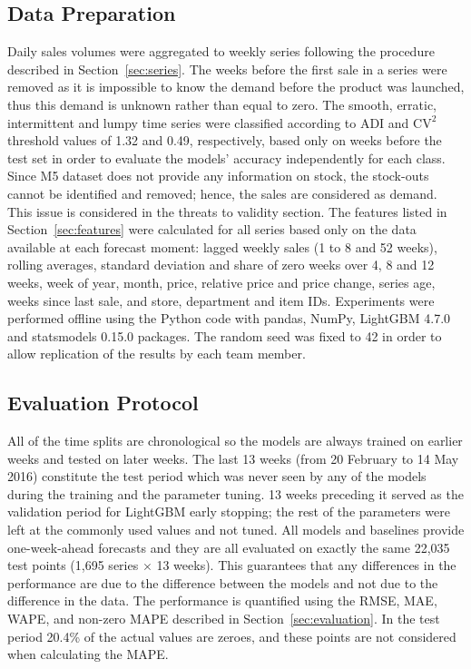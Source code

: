 \documentclass{StockSense}
\begin{document}
\subsection{Data Preparation}

Daily sales volumes were aggregated to weekly series following the procedure described in Section~\ref{sec:series}. The weeks before the first sale in a series were removed as it is impossible to know the demand before the product was launched, thus this demand is unknown rather than equal to zero. The smooth, erratic, intermittent and lumpy time series were classified according to ADI and $\mathrm{CV}^2$ threshold values of 1.32 and 0.49, respectively, based only on weeks before the test set in order to evaluate the models' accuracy independently for each class. Since M5 dataset does not provide any information on stock, the stock-outs cannot be identified and removed; hence, the sales are considered as demand. This issue is considered in the threats to validity section. The features listed in Section~\ref{sec:features} were calculated for all series based only on the data available at each forecast moment: lagged weekly sales (1 to 8 and 52 weeks), rolling averages, standard deviation and share of zero weeks over 4, 8 and 12 weeks, week of year, month, price, relative price and price change, series age, weeks since last sale, and store, department and item IDs. Experiments were performed offline using the Python code with pandas, NumPy, LightGBM 4.7.0 and statsmodels 0.15.0 packages. The random seed was fixed to 42 in order to allow replication of the results by each team member.

\subsection{Evaluation Protocol}

All of the time splits are chronological so the models are always trained on earlier weeks and tested on later weeks. The last 13 weeks (from 20 February to 14 May 2016) constitute the test period which was never seen by any of the models during the training and the parameter tuning. 13 weeks preceding it served as the validation period for LightGBM early stopping; the rest of the parameters were left at the commonly used values and not tuned. All models and baselines provide one-week-ahead forecasts and they are all evaluated on exactly the same 22,035 test points (1,695 series $\times$ 13 weeks). This guarantees that any differences in the performance are due to the difference between the models and not due to the difference in the data. The performance is quantified using the RMSE, MAE, WAPE, and non-zero MAPE described in Section~\ref{sec:evaluation}. In the test period 20.4\% of the actual values are zeroes, and these points are not considered when calculating the MAPE.
\end{document}
